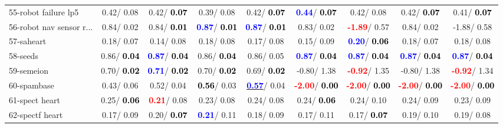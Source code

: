 \begin{table}[h]
\begin{center}
\begin{tabular}{lc|c|c|c|c|c|c|c}
55-robot failure lp5 &   0.42/  0.08 &   0.42/\textcolor{black}{\textbf{  0.07}} &   0.39/  0.08 &   0.42/\textcolor{black}{\textbf{  0.07}} & \textcolor{blue}{\textbf{  0.44}}/\textcolor{black}{\textbf{  0.07}} &   0.42/  0.08 &   0.42/\textcolor{black}{\textbf{  0.07}} &   0.41/\textcolor{black}{\textbf{  0.07}} \\
56-robot nav sensor r... &   0.84/  0.02 &   0.84/\textcolor{black}{\textbf{  0.01}} & \textcolor{blue}{\textbf{  0.87}}/\textcolor{black}{\textbf{  0.01}} & \textcolor{blue}{\textbf{  0.87}}/\textcolor{black}{\textbf{  0.01}} &   0.83/  0.02 & \textcolor{red}{\textbf{ -1.89}}/  0.57 &   0.84/  0.02 &  -1.88/  0.58 \\
57-saheart &   0.18/  0.07 &   0.14/  0.08 &   0.18/  0.08 &   0.17/  0.08 &   0.15/  0.09 & \textcolor{blue}{\textbf{  0.20}}/\textcolor{black}{\textbf{  0.06}} &   0.18/  0.07 &   0.18/  0.08 \\
58-seeds &   0.86/\textcolor{black}{\textbf{  0.04}} & \textcolor{blue}{\textbf{  0.87}}/\textcolor{black}{\textbf{  0.04}} &   0.86/\textcolor{black}{\textbf{  0.04}} &   0.86/  0.05 & \textcolor{blue}{\textbf{  0.87}}/\textcolor{black}{\textbf{  0.04}} & \textcolor{blue}{\textbf{  0.87}}/\textcolor{black}{\textbf{  0.04}} & \textcolor{blue}{\textbf{  0.87}}/\textcolor{black}{\textbf{  0.04}} & \textcolor{blue}{\textbf{  0.87}}/\textcolor{black}{\textbf{  0.04}} \\
59-semeion &   0.70/\textcolor{black}{\textbf{  0.02}} & \textcolor{blue}{\textbf{  0.71}}/\textcolor{black}{\textbf{  0.02}} &   0.70/\textcolor{black}{\textbf{  0.02}} &   0.69/\textcolor{black}{\textbf{  0.02}} &  -0.80/  1.38 & \textcolor{red}{\textbf{ -0.92}}/  1.35 &  -0.80/  1.38 & \textcolor{red}{\textbf{ -0.92}}/  1.34 \\
60-spambase &   0.43/  0.06 &   0.52/  0.04 & \textcolor{black}{\textbf{  0.56}}/  0.03 & \underline{\textcolor{blue}{\textbf{  0.57}}}/  0.04 & \textcolor{red}{\textbf{ -2.00}}/\textcolor{black}{\textbf{  0.00}} & \textcolor{red}{\textbf{ -2.00}}/\textcolor{black}{\textbf{  0.00}} & \textcolor{red}{\textbf{ -2.00}}/\textcolor{black}{\textbf{  0.00}} & \textcolor{red}{\textbf{ -2.00}}/\textcolor{black}{\textbf{  0.00}} \\ \hline
61-spect heart &   0.25/\textcolor{black}{\textbf{  0.06}} & \textcolor{red}{\textbf{  0.21}}/  0.08 &   0.23/  0.08 &   0.24/  0.08 &   0.24/\textcolor{black}{\textbf{  0.06}} &   0.24/  0.10 &   0.24/  0.09 &   0.23/  0.09 \\
62-spectf heart &   0.17/  0.09 &   0.20/\textcolor{black}{\textbf{  0.07}} & \textcolor{blue}{\textbf{  0.21}}/  0.11 &   0.18/  0.09 &   0.17/  0.11 &   0.17/\textcolor{black}{\textbf{  0.07}} &   0.19/  0.10 &   0.19/  0.08 \\

\end{tabular}
\end{center}
\end{table}
